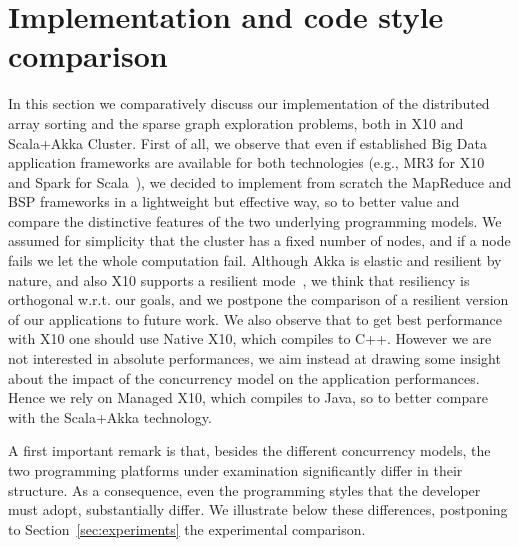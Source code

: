 \documentclass[a4paper]{article}
\numberwithin{equation}{section}
\begin{document}
\section{Implementation and code style comparison}
\label{sec:implementations}
In this section we comparatively discuss our implementation of the
distributed array sorting and the sparse graph exploration problems,
both in X10 and Scala+Akka Cluster. 
First of all, we observe that even if established Big Data application
frameworks are available for both technologies (e.g., MR3 for
X10~\cite{M3R-X10} and Spark for Scala~\cite{Zaharia:2010:SCC:1863103.1863113}), we decided to
implement from scratch the MapReduce and BSP frameworks in a
lightweight but effective way, so to better value and compare the
distinctive features of the two underlying programming models. 
We assumed for simplicity that the cluster has a fixed number of
nodes, and if a node fails we let the whole computation fail.
Although Akka is elastic and resilient by nature, and also X10
supports a resilient mode~\cite{X10resilient}, we think that
resiliency is orthogonal w.r.t. our goals, and we postpone the
comparison of a resilient version of our applications to future work. 
We also observe that to get
best performance with X10 one should use Native X10, which compiles to
C++. However we are not interested in absolute performances, we aim
instead at drawing some insight about the impact  
of the concurrency model on the application performances. 
Hence we rely on Managed X10, which compiles to Java, so to better
compare with the Scala+Akka technology.

A first important remark is that, besides the different concurrency
models, 
the two programming platforms under examination significantly 
differ in their structure. As a consequence, even the programming 
styles that the developer must adopt, substantially differ. 
We illustrate below these differences, postponing to
Section~\ref{sec:experiments} the experimental comparison. 
\end{document}
